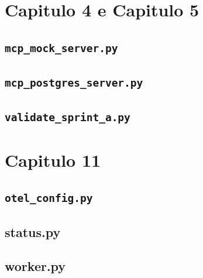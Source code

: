 \section{Capitulo 4 e Capitulo 5}

\subsection{\texttt{mcp\_mock\_server.py}}


\subsection{\texttt{mcp\_postgres\_server.py}}


\subsection{\texttt{validate\_sprint\_a.py}}


\section{Capitulo 11}

\subsection{\texttt{otel\_config.py}}


\subsection{status.py}


\subsection{worker.py}


